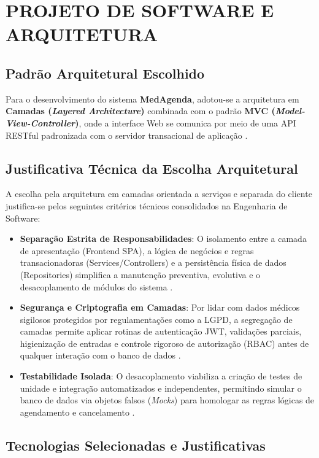 \section{PROJETO DE SOFTWARE E ARQUITETURA}

\subsection{Padrão Arquitetural Escolhido}

Para o desenvolvimento do sistema \textbf{MedAgenda}, adotou-se a arquitetura em \textbf{Camadas (\textit{Layered Architecture})} combinada com o padrão \textbf{MVC (\textit{Model-View-Controller})}, onde a interface Web se comunica por meio de uma API RESTful padronizada com o servidor transacional de aplicação \cite{martin2019, fowler2002}.

\subsection{Justificativa Técnica da Escolha Arquitetural}

A escolha pela arquitetura em camadas orientada a serviços e separada do cliente justifica-se pelos seguintes critérios técnicos consolidados na Engenharia de Software:
\begin{itemize}
    \item \textbf{Separação Estrita de Responsabilidades}: O isolamento entre a camada de apresentação (Frontend SPA), a lógica de negócios e regras transacionadoras (Services/Controllers) e a persistência física de dados (Repositories) simplifica a manutenção preventiva, evolutiva e o desacoplamento de módulos do sistema \cite{martin2019}.
    \item \textbf{Segurança e Criptografia em Camadas}: Por lidar com dados médicos sigilosos protegidos por regulamentações como a LGPD, a segregação de camadas permite aplicar rotinas de autenticação JWT, validações parciais, higienização de entradas e controle rigoroso de autorização (RBAC) antes de qualquer interação com o banco de dados \cite{silberschatz2020}.
    \item \textbf{Testabilidade Isolada}: O desacoplamento viabiliza a criação de testes de unidade e integração automatizados e independentes, permitindo simular o banco de dados via objetos falsos (\textit{Mocks}) para homologar as regras lógicas de agendamento e cancelamento \cite{myers2011}.
\end{itemize}

\subsection{Tecnologias Selecionadas e Justificativas}

